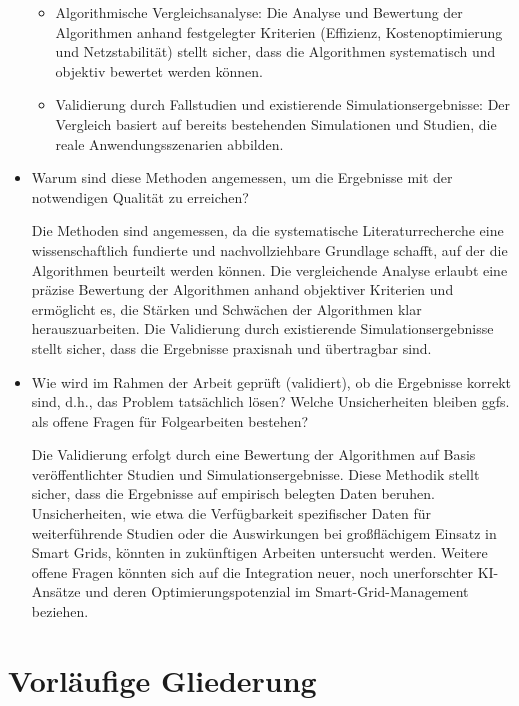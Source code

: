 \documentclass[12pt]{article} %
\begin{document}
\begin{itemize}
\begin{itemize}
        \item Algorithmische Vergleichsanalyse: Die Analyse und Bewertung der Algorithmen anhand festgelegter Kriterien (Effizienz, Kostenoptimierung und Netzstabilität) stellt sicher, dass die Algorithmen systematisch und objektiv bewertet werden können. 
        \item Validierung durch Fallstudien und existierende Simulationsergebnisse: Der Vergleich basiert auf bereits bestehenden Simulationen und Studien, die reale Anwendungsszenarien abbilden. 
    \end{itemize}

\item Warum sind diese Methoden angemessen, um die Ergebnisse mit der notwendigen Qualität zu erreichen?

    Die Methoden sind angemessen, da die systematische Literaturrecherche eine wissenschaftlich fundierte und nachvollziehbare Grundlage schafft, auf der die Algorithmen beurteilt werden können. Die vergleichende Analyse erlaubt eine präzise Bewertung der Algorithmen anhand objektiver Kriterien und ermöglicht es, die Stärken und Schwächen der Algorithmen klar herauszuarbeiten. Die Validierung durch existierende Simulationsergebnisse stellt sicher, dass die Ergebnisse praxisnah und übertragbar sind.

\item Wie wird im Rahmen der Arbeit geprüft (validiert), ob die Ergebnisse korrekt sind, d.h., das Problem tatsächlich lösen? Welche Unsicherheiten bleiben ggfs. als offene Fragen für Folgearbeiten bestehen?

    Die Validierung erfolgt durch eine Bewertung der Algorithmen auf Basis veröffentlichter Studien und Simulationsergebnisse. Diese Methodik stellt sicher, dass die Ergebnisse auf empirisch belegten Daten beruhen. Unsicherheiten, wie etwa die Verfügbarkeit spezifischer Daten für weiterführende Studien oder die Auswirkungen bei großflächigem Einsatz in Smart Grids, könnten in zukünftigen Arbeiten untersucht werden. Weitere offene Fragen könnten sich auf die Integration neuer, noch unerforschter KI-Ansätze und deren Optimierungspotenzial im Smart-Grid-Management beziehen.
    
\end{itemize}



\section{Vorläufige Gliederung}
\end{document}

